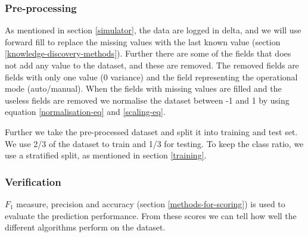 \documentclass[english, a4paper]{report}
\begin{document}
{{{            \subsubsection{Pre-processing} \label{pre-process-simulator}
            {
                As mentioned in section \ref{simulator}, the data are logged in delta, and we will use forward fill to replace the missing values with the last known value (section \ref{knowledge-discovery-methods}). Further there are some of the fields that does not add any value to the dataset, and these are removed. The removed fields are fields with only one value (0 variance) and the field representing the operational mode (auto/manual). When the fields with missing values are filled and the useless fields are removed we normalise the dataset between -1 and 1 by using equation \ref{normalisation-eq} and \ref{scaling-eq}.
                \par
                Further we take the pre-processed dataset and split it into training and test set. We use 2/3 of the dataset to train and 1/3 for testing. To keep the class ratio, we use a stratified split, as mentioned in section \ref{training}.
            }
            
            \subsubsection{Verification}
            {
                $F_1$ measure, precision and accuracy (section \ref{methods-for-scoring}) is used to evaluate the prediction performance. From these scores we can tell how well the different algorithms perform on the dataset.
            }
            
}}}
\end{document}
